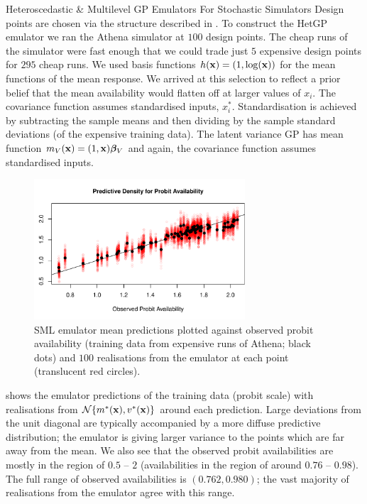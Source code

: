 \begin{chapter}{Heteroscedastic \& Multilevel GP Emulators For Stochastic Simulators\label{Ch:Hetsml}}
Design points are chosen via the structure described in . To construct the HetGP emulator we ran the Athena simulator at $100$ design points. The cheap runs of the simulator were fast enough that we could trade just $5$ expensive design points for $295$ cheap runs. We used basis functions $h(\mathbf{x}) = (1, \log(\mathbf{x}))$ for the mean functions of the mean response. We arrived at this selection to reflect a prior belief that the mean availability would flatten off at larger values of $x_i$. The covariance function assumes standardised inputs, $x_i^*$. Standardisation is achieved by subtracting the sample means and then dividing by the sample standard deviations (of the expensive training data). The latent variance GP has mean function $m_V(\mathbf{x}) = (1, \mathbf{x})\bm{\bm{\beta}}_V$ and again, the covariance function assumes standardised inputs.
\begin{figure}
	\centering
	\includegraphics[width=0.7\textwidth]{sml-het-fig2/obs-pred-new.pdf}
\caption{SML emulator mean predictions plotted against observed probit availability (training data from expensive runs of Athena; black dots) and $100$ realisations from the emulator at each point (translucent red circles).\label{Fig:within-sample}}
\end{figure}
 shows the emulator predictions of the training data (probit scale) with realisations from $\mathcal{N}\{m^{*}(\mathbf{x}), v^{*}(\mathbf{x})\}$ around each prediction. Large deviations from the unit diagonal are typically accompanied by a more diffuse predictive distribution; the emulator is giving larger variance to the points which are far away from the mean. We also see that the observed probit availabilities are mostly in the region of $0.5$ -- $2$ (availabilities in the region of around $0.76$ -- $0.98$). The full range of observed availabilities is $(0.762, 0.980)$; the vast majority of realisations from the emulator agree with this range.


\end{chapter}

